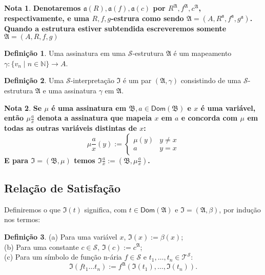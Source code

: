 \documentclass[11pt]{article}
\theoremstyle{definition}
\newtheorem{defn}{Definição}
\newtheorem{note}{Nota}
\newcommand{\mc}[1]{\mathcal{#1}}
\newcommand{\mf}[1]{\mathfrak{#1}}
\newcommand{\msf}[1]{\mathsf{#1}}
\newcommand{\mbb}[1]{\mathbb{#1}}
\begin{document}
\begin{note}
\textbf{Denotaremos $\mf{a}(R),\mf{a}(f),\mf{a}(c)$ por $R^\mf{A},f^\mf{A},c^\mf{A}$, respectivamente, e uma ${R,f,g}$-estrura como sendo $\mf{A}=\left(A,R^\mf{a},f^\mf{a},g^\mf{a}\right)$. Quando a estrutura estiver subtendida escreveremos somente $\mf{A}=(A,R,f,g)$}
\end{note}

\begin{shaded}
\begin{defn}
Uma assinatura em uma $\mc{S}$-estrutura $\mf{A}$ é um mapeamento $\gamma:\{v_n\mid n\in\mbb{N}\}\to A$.
\end{defn}
\end{shaded}

\begin{shaded}
\begin{defn}
Uma $\mc{S}$-interpretação $\mf{I}$ é um par $(\mf{A},\gamma)$ consistindo de uma $\mc{S}$-estrutura $\mf{A}$ e uma assinatura $\gamma$ em $\mf{A}$.
\end{defn}
\end{shaded}

\begin{note}
\textbf{Se $\mu$ é uma assinatura em $\mf{B},a\in\msf{Dom}(\mf{B})$ e $x$ é uma variável, então $\mu\frac{a}{x}$ denota a assinatura que mapeia $x$ em $a$ e concorda com $\mu$ em todas as outras variáveis distintas de $x$:
\[
\mu\frac{a}{x}(y):=
\begin{cases}
    \mu(y) & y\ne x\\
    a & y=x
\end{cases}
\]
E para $\mf{I}=(\mf{B},\mu)$ temos $\mf{I}\frac{a}{x}:=\left(\mf{B},\mu\frac{a}{x}\right)$.
}
\end{note}

\subsection{Relação de Satisfação}

Definiremos o que $\mf{I}(t)$ significa, com $t\in\msf{Dom}(\mf{A})$ e $\mf{I}=(\mf{A},\beta)$, por indução nos termos:

\begin{shaded}
\begin{defn}
(a) Para uma variável $x$, $\mf{I}(x):=\beta(x)$;\\
(b) Para uma constante $c\in\mc{S}$, $\mf{I}(c):=c^\mf{A}$;\\
(c) Para um símbolo de função n-ária $f\in\mc{S}$ e $t_1,\dots,t_n\in\mc{T}^\mc{S}$:
\[
\mf{I}(ft_1\dots t_n):=f^\mf{A}(\mf{I}(t_1),\dots,\mf{I}(t_n)).
\]
\end{defn}
\end{shaded}
\end{document}
